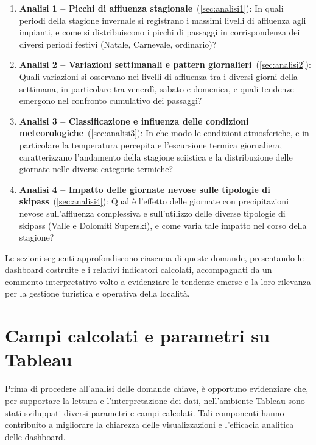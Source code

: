 \begin{enumerate}
    \item \textbf{Analisi 1 – Picchi di affluenza stagionale}~(\ref{sec:analisi1}):  
    In quali periodi della stagione invernale si registrano i massimi livelli di affluenza agli impianti, e come si distribuiscono i picchi di passaggi in corrispondenza dei diversi periodi festivi (Natale, Carnevale, ordinario)?

    \item \textbf{Analisi 2 – Variazioni settimanali e pattern giornalieri}~(\ref{sec:analisi2}):  
    Quali variazioni si osservano nei livelli di affluenza tra i diversi giorni della settimana, in particolare tra venerdì, sabato e domenica, e quali tendenze emergono nel confronto cumulativo dei passaggi?

    \item \textbf{Analisi 3 – Classificazione e influenza delle condizioni meteorologiche}~(\ref{sec:analisi3}):  
    In che modo le condizioni atmosferiche, e in particolare la temperatura percepita e l’escursione termica giornaliera, caratterizzano l’andamento della stagione sciistica e la distribuzione delle giornate nelle diverse categorie termiche?

    \item \textbf{Analisi 4 – Impatto delle giornate nevose sulle tipologie di skipass}~(\ref{sec:analisi4}):  
    Qual è l’effetto delle giornate con precipitazioni nevose sull’affluenza complessiva e sull’utilizzo delle diverse tipologie di skipass (Valle e Dolomiti Superski), e come varia tale impatto nel corso della stagione?
\end{enumerate}


Le sezioni seguenti approfondiscono ciascuna di queste domande, presentando le dashboard costruite e i relativi indicatori calcolati, accompagnati da un commento interpretativo volto a evidenziare le tendenze emerse e la loro rilevanza per la gestione turistica e operativa della località.

\newpage

\section{Campi calcolati e parametri su Tableau}

Prima di procedere all’analisi delle domande chiave, è opportuno evidenziare che, per supportare la lettura e l’interpretazione dei dati, nell’ambiente Tableau sono stati sviluppati diversi parametri e campi calcolati. Tali componenti hanno contribuito a migliorare la chiarezza delle visualizzazioni e l’efficacia analitica delle dashboard.

